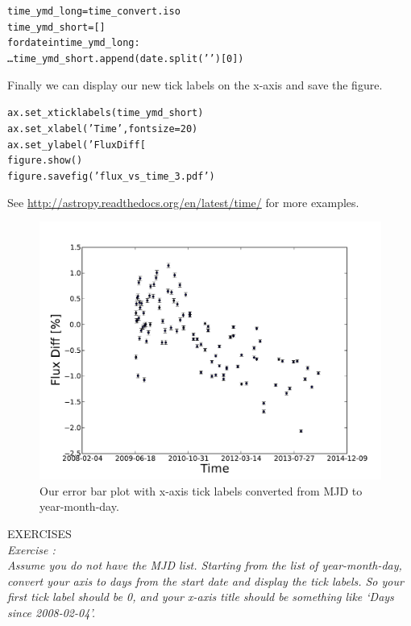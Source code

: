 \begin{alltt}
\pytab time\_ymd\_long = time\_convert.iso
\pytab time\_ymd\_short = []
\pytab for date in time\_ymd\_long:
\ldots    time\_ymd\_short.append(date.split(' ')[0])
\end{alltt}

Finally we can display our new tick labels on the x-axis and save the figure.

\begin{alltt}
\pytab ax.set\_xticklabels(time\_ymd\_short)
\pytab ax.set\_xlabel('Time', fontsize=20)
\pytab ax.set\_ylabel('Flux Diff [%
\pytab figure.show()
\pytab figure.savefig('flux_vs_time_3.pdf')
\end{alltt}

See \href{http://astropy.readthedocs.org/en/latest/time/}{http://astropy.readthedocs.org/en/latest/time/} for more examples.

\begin{figure}[tbp]
  \centering
    \includegraphics[scale=0.55]{flux_vs_time_3.pdf}
    \caption{Our error bar plot with x-axis tick labels converted from MJD to year-month-day.}
  \label{fig:flux_vs_time_3}
\end{figure}

{\color{blue} {\sf\small EXERCISES}} \\
{\it Exercise  :  \\
Assume you do not have the MJD list. Starting from the list of year-month-day, convert your axis to days from the start date
and display the tick labels. 
So your first tick label should be 0, and your x-axis title should be something like `Days since 2008-02-04'.}


